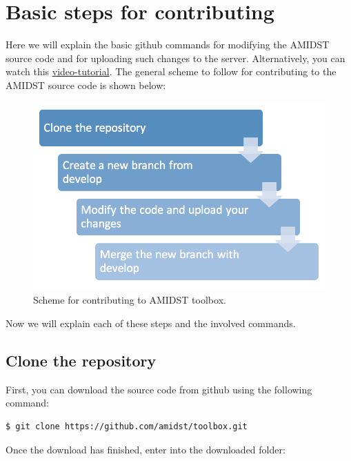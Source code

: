 \documentclass[10pt,a4paper]{article}
\begin{document}
\section{Basic steps for
	contributing}\label{basic-steps-for-contributing}

Here we will explain the basic github commands for modifying the AMIDST
source code and for uploading such changes to the server. Alternatively,
you can watch this
\href{https://www.youtube.com/watch?v=HegfZZyQ8u4}{video-tutorial}. The
general scheme to follow for contributing to the AMIDST source code is
shown below:

\begin{figure}[h!]
	\includegraphics[width=12cm]{img/scheme_contributing.png}
	\caption{Scheme for contributing to AMIDST toolbox.}
	\label{fig:scheme_contributing}	
\end{figure}


\noindent Now we will explain each of these steps and the involved
commands.\newline 



\subsection{Clone the repository}\label{clone-the-repository}

First, you can download the source code from github using the following
command:

\begin{verbatim}
$ git clone https://github.com/amidst/toolbox.git      
\end{verbatim}

\noindent Once the download has finished, enter into the downloaded
folder:\newline
\end{document}
